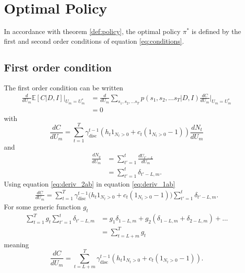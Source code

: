 \section{Optimal Policy}
\label{app:deriva}
In accordance with theorem \ref{def:policy}, the optimal policy $\pi^*$ is defined by the first and second order conditions of equation \eqref{eq:conditions}.

\subsection{First order condition}
The first order condition can be written
\begin{equation}
	\begin{split}
		\frac{d}{dU_m} \mathbb{E}[C | D, I] \Big|_{U_m = U_m^*} &= \frac{d}{dU_m} \sum_{s_1,s_2,\dots s_T}  p(s_1,s_{2},\dots s_T|D,I)\frac{dC}{dU_m}\Big|_{U_m=U_m^*}\\
		&=0
	\end{split}
	\label{eq:cond}
\end{equation}
with
\begin{equation}
		\frac{dC}{dU_m} = \sum_{t=1}^{T} \gamma_{\text{disc}}^{t-1} \left( h_t 1_{N_t> 0} + c_t (1_{N_t> 0}-1) \right)\frac{dN_t}{dU_m}
	\label{eq:deriv_1ab}
\end{equation}
and
\begin{equation}
	\begin{split}
		\frac{dN_q}{dU_m} &= \sum_{t'=1}^t\frac{dU_{t'-L}}{dU_m}\\
		& = \sum_{t'=1}^t\delta_{t'-L,m}.
	\label{eq:deriv_2ab}
	\end{split}
\end{equation}
Using equation \eqref{eq:deriv_2ab} in equation \eqref{eq:deriv_1ab} 
\begin{equation}
	\begin{split}
		\frac{dC}{dU_m} = \sum_{t=1}^{T}\gamma_{\text{disc}}^{t-1}\bigg(h_t1_{N_t> 0}+c_t(1_{N_t> 0}-1)\bigg)\sum_{t'=1}^t\delta_{t'-L,m}.
	\end{split}
\end{equation}
For some generic function $g_t$
\begin{equation}
	\begin{split}
		\sum_{t=1}^{T}g_t\sum_{t'=1}^t\delta_{t'-L,m} & = g_1\delta_{1-L,m}+g_2(\delta_{1-L,m}+\delta_{2-L,m})+\dots\\
		&=\sum_{t=L+m}^T g_t
	\end{split}
\end{equation}
meaning
\begin{equation}
	\frac{dC}{dU_m} = \sum_{t=L+m}^{T}\gamma_{\text{disc}}^{t-1}(h_t1_{N_t> 0}+c_t(1_{N_t> 0}-1)).
	\label{eq:deriv_3a}
\end{equation}
